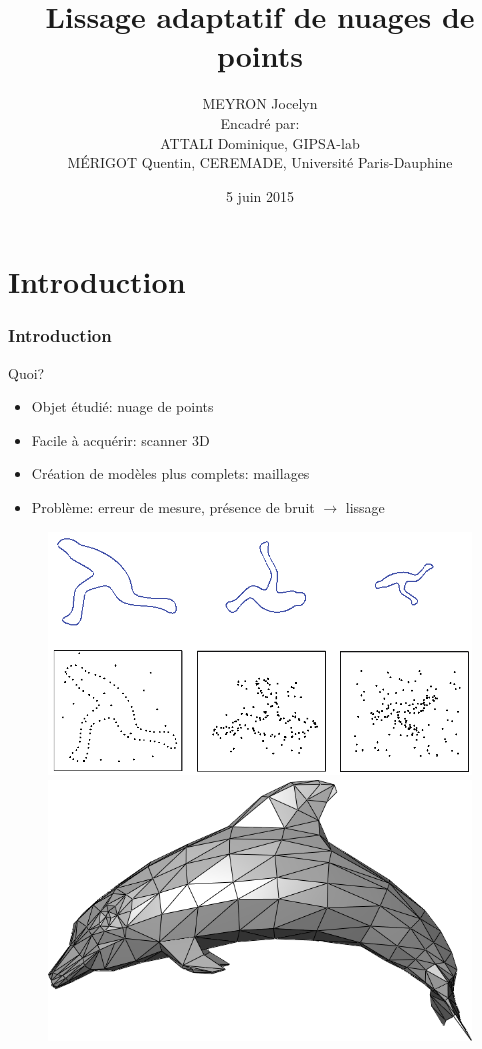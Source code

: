 \documentclass{beamer}
\title[Lissage adaptatif de nuages de points]{Lissage adaptatif de nuages de
    points}
\author[MEYRON Jocelyn]{MEYRON Jocelyn\\\scriptsize{Encadré par:\\
        ATTALI Dominique, GIPSA-lab\\
        MÉRIGOT Quentin, CEREMADE, Université Paris-Dauphine}}
\institute{GIPSA-lab}
\date{5 juin 2015}
\begin{document}
\begin{frame}
    \titlepage
\end{frame}

\begin{frame}
    \tableofcontents
\end{frame}

\section{Introduction}

\begin{frame}[allowframebreaks]
    \frametitle{Introduction}

    Quoi?
    \begin{itemize}
        \item Objet étudié: nuage de points
        \item Facile à acquérir: scanner 3D
        \item Création de modèles plus complets: maillages
        \item Problème: erreur de mesure, présence de bruit $ \to $ lissage
    \end{itemize}

    \begin{figure}
        \centering
        \includegraphics[scale=0.2]{img/noise-2d}
        \includegraphics[scale=0.2]{img/mesh-3d-dolphin}
    \end{figure}


\end{frame}
\end{document}
